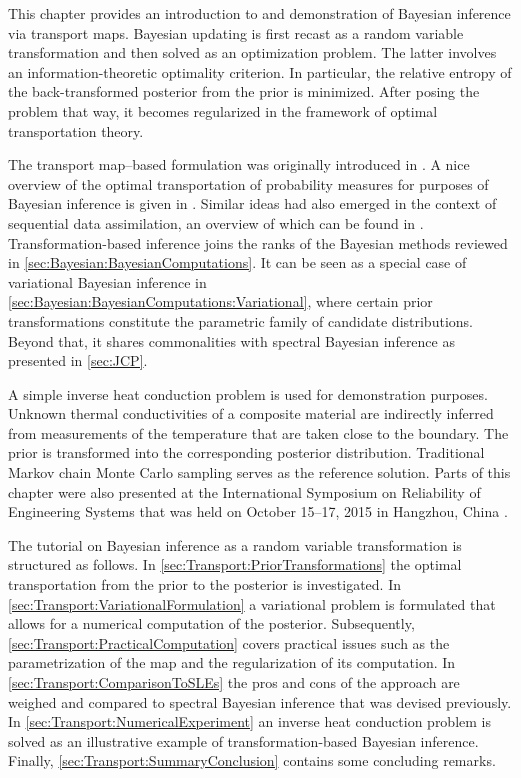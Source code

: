 This chapter provides an introduction to and demonstration of Bayesian inference via transport maps.
Bayesian updating is first recast as a random variable transformation and then solved as an optimization problem.
The latter involves an information-theoretic optimality criterion.
In particular, the relative entropy of the back-transformed posterior from the prior is minimized.
After posing the problem that way, it becomes regularized in the framework of optimal transportation theory.
\par %
The transport map--based formulation was originally introduced in \cite{Mapping:ElMoselhy2012}.
A nice overview of the optimal transportation of probability measures for purposes of Bayesian inference is given in \cite{Mapping:Marzouk2016}.
Similar ideas had also emerged in the context of sequential data assimilation, an overview of which can be found in \cite{Mapping:Reich2013:b,Bayesian:VanLeeuwen2015}.
Transformation-based inference joins the ranks of the Bayesian methods reviewed in \cref{sec:Bayesian:BayesianComputations}.
It can be seen as a special case of variational Bayesian inference in \cref{sec:Bayesian:BayesianComputations:Variational},
where certain prior transformations constitute the parametric family of candidate distributions.
Beyond that, it shares commonalities with spectral Bayesian inference as presented in \cref{sec:JCP}.
\par %
A simple inverse heat conduction problem is used for demonstration purposes.
Unknown thermal conductivities of a composite material are indirectly inferred from measurements of the temperature that are taken close to the boundary.
The prior is transformed into the corresponding posterior distribution.
Traditional Markov chain Monte Carlo sampling serves as the reference solution.
Parts of this chapter were also presented at the International Symposium on Reliability of Engineering Systems
that was held on October 15--17, 2015 in Hangzhou, China \cite{Nagel:SRES2015:Pres}.
\par %
The tutorial on Bayesian inference as a random variable transformation is structured as follows.
In \cref{sec:Transport:PriorTransformations} the optimal transportation from the prior to the posterior is investigated.
In \cref{sec:Transport:VariationalFormulation} a variational problem is formulated that allows for a numerical computation of the posterior.
Subsequently, \cref{sec:Transport:PracticalComputation} covers practical issues such as the parametrization of the map and the regularization of its computation.
In \cref{sec:Transport:ComparisonToSLEs} the pros and cons of the approach are weighed and compared to spectral Bayesian inference that was devised previously.
In \cref{sec:Transport:NumericalExperiment} an inverse heat conduction problem is solved as an illustrative example of transformation-based Bayesian inference.
Finally, \cref{sec:Transport:SummaryConclusion} contains some concluding remarks.